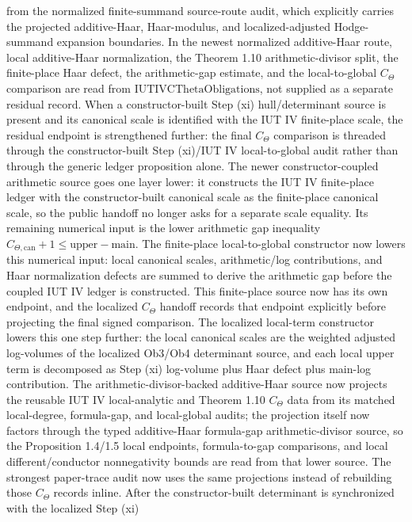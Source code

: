 \documentclass[11pt]{article}
\theoremstyle{plain}
\theoremstyle{definition}
\theoremstyle{remark}
\begin{document}
from the normalized finite-summand source-route audit, which explicitly carries
the projected additive-Haar, Haar-modulus, and localized-adjusted
Hodge-summand expansion boundaries.  In the newest normalized
additive-Haar route, local additive-Haar normalization, the Theorem 1.10
arithmetic-divisor split, the finite-place Haar defect, the arithmetic-gap
estimate, and the local-to-global \(C_{\Theta}\) comparison are read from
\(\mathrm{IUTIVCThetaObligations}\), not supplied as a separate residual record.
When a constructor-built Step (xi) hull/determinant source is present and its
canonical scale is identified with the IUT IV finite-place scale, the residual
endpoint is strengthened further: the final \(C_{\Theta}\) comparison is
threaded through the constructor-built Step (xi)/IUT IV local-to-global audit
rather than through the generic ledger proposition alone.  The newer
constructor-coupled arithmetic source goes one layer lower: it constructs the
IUT IV finite-place ledger with the constructor-built canonical scale as the
finite-place canonical scale, so the public handoff no longer asks for a
separate scale equality.  Its remaining numerical input is the lower arithmetic
gap inequality \(C_{\Theta,\mathrm{can}}+1\leq \mathrm{upper}-\mathrm{main}\).
The finite-place local-to-global constructor now lowers this numerical input:
local canonical scales, arithmetic/log contributions, and Haar normalization
defects are summed to derive the arithmetic gap before the coupled IUT IV
ledger is constructed.  This finite-place source now has its own endpoint,
and the localized \(C_\Theta\) handoff records that endpoint explicitly before
projecting the final signed comparison.
	The localized local-term constructor lowers this one step further: the local
	canonical scales are the weighted adjusted log-volumes of the localized
	Ob3/Ob4 determinant source, and each local upper term is decomposed as Step
	(xi) log-volume plus Haar defect plus main-log contribution.  The
	arithmetic-divisor-backed additive-Haar source now projects the reusable IUT IV
	local-analytic and Theorem 1.10 \(C_{\Theta}\) data from its matched
	local-degree, formula-gap, and local-global audits; the projection itself now
	factors through the typed additive-Haar formula-gap arithmetic-divisor source,
	so the Proposition 1.4/1.5 local endpoints, formula-to-gap comparisons, and
	local different/conductor nonnegativity bounds are read from that lower
	source.  The strongest paper-trace audit now uses the same projections instead
	of rebuilding those \(C_{\Theta}\) records inline.  After the
	constructor-built determinant is synchronized with the localized Step (xi)
\end{document}
